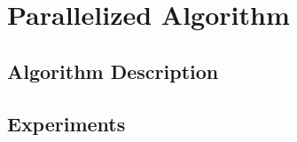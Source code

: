 \section{Parallelized Algorithm}

\figureBegin


\figureEnd

\figureBegin

\figureEnd

\subsection{Algorithm Description}

\subsection{Experiments}